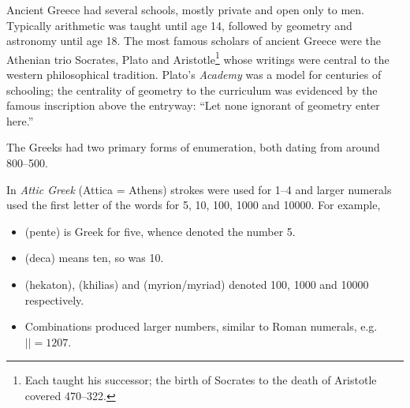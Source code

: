 Ancient Greece had several schools, mostly private and open only to men. %
Typically arithmetic was taught until age 14, followed by geometry  and astronomy until age 18. The most famous scholars of ancient Greece were the Athenian trio Socrates, Plato and Aristotle\footnote{Each taught his successor; the birth of Socrates to the death of Aristotle covered 470--322\BC.} whose writings were central to the western philosophical tradition. Plato's \emph{Academy} was a model for centuries of schooling; the centrality of geometry to the curriculum was evidenced by the famous inscription above the entryway: ``Let none ignorant of geometry enter here.''



The Greeks had two primary forms of enumeration, both dating from around 800--500\BC.\smallbreak

In \emph{Attic Greek} (Attica = Athens) strokes were used for 1--4 and larger numerals used the first letter of the words for 5, 10, 100, 1000 and 10000. For example,
\begin{itemize}\itemsep0pt
  \item {} (pente) is Greek for five, whence  denoted the number 5.
	\item {} (deca) means ten, so  was 10.
	\item {} (hekaton),  (khilias) and  (myrion/myriad) denoted 100, 1000 and 10000 respectively.
	\item Combinations produced larger numbers, similar to Roman numerals, e.g.{} $||=1207$.
\end{itemize}

